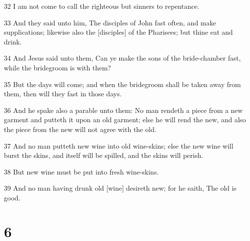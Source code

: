 \par 32 I am not come to call the righteous but sinners to repentance.
\par 33 And they said unto him, The disciples of John fast often, and make supplications; likewise also the [disciples] of the Pharisees; but thine eat and drink.
\par 34 And Jesus said unto them, Can ye make the sons of the bride-chamber fast, while the bridegroom is with them?
\par 35 But the days will come; and when the bridegroom shall be taken away from them, then will they fast in those days.
\par 36 And he spake also a parable unto them: No man rendeth a piece from a new garment and putteth it upon an old garment; else he will rend the new, and also the piece from the new will not agree with the old.
\par 37 And no man putteth new wine into old wine-skins; else the new wine will burst the skins, and itself will be spilled, and the skins will perish.
\par 38 But new wine must be put into fresh wine-skins.
\par 39 And no man having drunk old [wine] desireth new; for he saith, The old is good.

\chapter{6}

